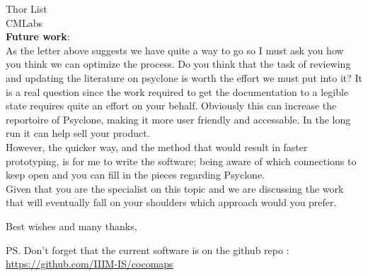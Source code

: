 \documentclass[a4, 12pt]{letter}
\begin{document}
\begin{letter}{Thor List \\ CMLabs \\ }
\textbf{Future work}: \\
As the letter above suggests we have quite a way to go so I must ask you how you think we can optimize the process. Do you think that the task of reviewing and updating the literature on psyclone is worth the effort we must put into it? It is a real question since the work required to get the documentation to a legible state requires quite an effort on your behalf. Obviously this can increase the reportoire of Psyclone, making it more user friendly and accessable. In the long run it can help sell your product. \\
However, the quicker way, and the method that would result in faster prototyping, is for me to write the software; being aware of which connections to keep open and you can fill in the pieces regarding Psyclone. \\
Given that you are the specialist on this topic and we are discussing the work that will eventually fall on your shoulders which approach would you prefer.  


\closing{Best wishes and many thanks, }

\ps 
Don't forget that the current software is on the github repo : \url{https://github.com/IIIM-IS/cocomaps}
\end{letter}
\end{document}
